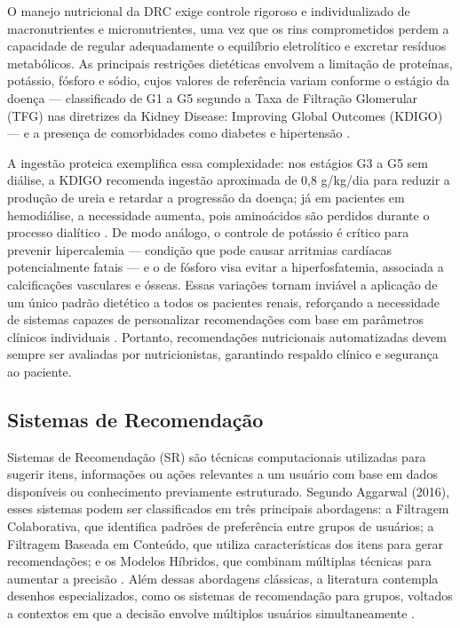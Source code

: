\documentclass[12pt, a4paper, twocolumn]{article}
\begin{document}
O manejo nutricional da DRC exige controle rigoroso e individualizado de macronutrientes e micronutrientes, uma vez que os rins comprometidos perdem a capacidade de regular adequadamente o equilíbrio eletrolítico e excretar resíduos metabólicos. As principais restrições dietéticas envolvem a limitação de proteínas, potássio, fósforo e sódio, cujos valores de referência variam conforme o estágio da doença --- classificado de G1 a G5 segundo a Taxa de Filtração Glomerular (TFG) nas diretrizes da Kidney Disease: Improving Global Outcomes (KDIGO) --- e a presença de comorbidades como diabetes e hipertensão \cite{vasconcelos2021,kdigo2024}.

A ingestão proteica exemplifica essa complexidade: nos estágios G3 a G5 sem diálise, a KDIGO recomenda ingestão aproximada de 0,8 g/kg/dia para reduzir a produção de ureia e retardar a progressão da doença; já em pacientes em hemodiálise, a necessidade aumenta, pois aminoácidos são perdidos durante o processo dialítico \cite{vasconcelos2021}. De modo análogo, o controle de potássio é crítico para prevenir hipercalemia --- condição que pode causar arritmias cardíacas potencialmente fatais --- e o de fósforo visa evitar a hiperfosfatemia, associada a calcificações vasculares e ósseas. Essas variações tornam inviável a aplicação de um único padrão dietético a todos os pacientes renais, reforçando a necessidade de sistemas capazes de personalizar recomendações com base em parâmetros clínicos individuais \cite{vasconcelos2021}. Portanto, recomendações nutricionais automatizadas devem sempre ser avaliadas por nutricionistas, garantindo respaldo clínico e segurança ao paciente.

    \subsection{Sistemas de Recomendação}

Sistemas de Recomendação (SR) são técnicas computacionais utilizadas para sugerir itens, informações ou ações relevantes a um usuário com base em dados disponíveis ou conhecimento previamente estruturado. Segundo Aggarwal (2016), esses sistemas podem ser classificados em três principais abordagens: a Filtragem Colaborativa, que identifica padrões de preferência entre grupos de usuários; a Filtragem Baseada em Conteúdo, que utiliza características dos itens para gerar recomendações; e os Modelos Híbridos, que combinam múltiplas técnicas para aumentar a precisão \cite{aggarwal}. Além dessas abordagens clássicas, a literatura contempla desenhos especializados, como os sistemas de recomendação para grupos, voltados a contextos em que a decisão envolve múltiplos usuários simultaneamente \cite{felfernig}.
\end{document}
